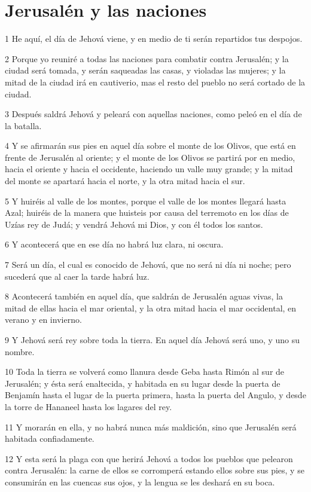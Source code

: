 \section*{Jerusalén y las naciones}

\par 1 He aquí, el día de Jehová viene, y en medio de ti serán repartidos tus despojos.
\par 2 Porque yo reuniré a todas las naciones para combatir contra Jerusalén; y la ciudad será tomada, y serán saqueadas las casas, y violadas las mujeres; y la mitad de la ciudad irá en cautiverio, mas el resto del pueblo no será cortado de la ciudad.
\par 3 Después saldrá Jehová y peleará con aquellas naciones, como peleó en el día de la batalla.
\par 4 Y se afirmarán sus pies en aquel día sobre el monte de los Olivos, que está en frente de Jerusalén al oriente; y el monte de los Olivos se partirá por en medio, hacia el oriente y hacia el occidente, haciendo un valle muy grande; y la mitad del monte se apartará hacia el norte, y la otra mitad hacia el sur.
\par 5 Y huiréis al valle de los montes, porque el valle de los montes llegará hasta Azal; huiréis de la manera que huisteis por causa del terremoto en los días de Uzías rey de Judá; y vendrá Jehová mi Dios, y con él todos los santos.
\par 6 Y acontecerá que en ese día no habrá luz clara, ni oscura.
\par 7 Será un día, el cual es conocido de Jehová, que no será ni día ni noche; pero sucederá que al caer la tarde habrá luz.
\par 8 Acontecerá también en aquel día, que saldrán de Jerusalén aguas vivas, la mitad de ellas hacia el mar oriental, y la otra mitad hacia el mar occidental, en verano y en invierno.
\par 9 Y Jehová será rey sobre toda la tierra. En aquel día Jehová será uno, y uno su nombre.
\par 10 Toda la tierra se volverá como llanura desde Geba hasta Rimón al sur de Jerusalén; y ésta será enaltecida, y habitada en su lugar desde la puerta de Benjamín hasta el lugar de la puerta primera, hasta la puerta del Angulo, y desde la torre de Hananeel hasta los lagares del rey.
\par 11 Y morarán en ella, y no habrá nunca más maldición, sino que Jerusalén será habitada confiadamente.
\par 12 Y esta será la plaga con que herirá Jehová a todos los pueblos que pelearon contra Jerusalén: la carne de ellos se corromperá estando ellos sobre sus pies, y se consumirán en las cuencas sus ojos, y la lengua se les deshará en su boca.
